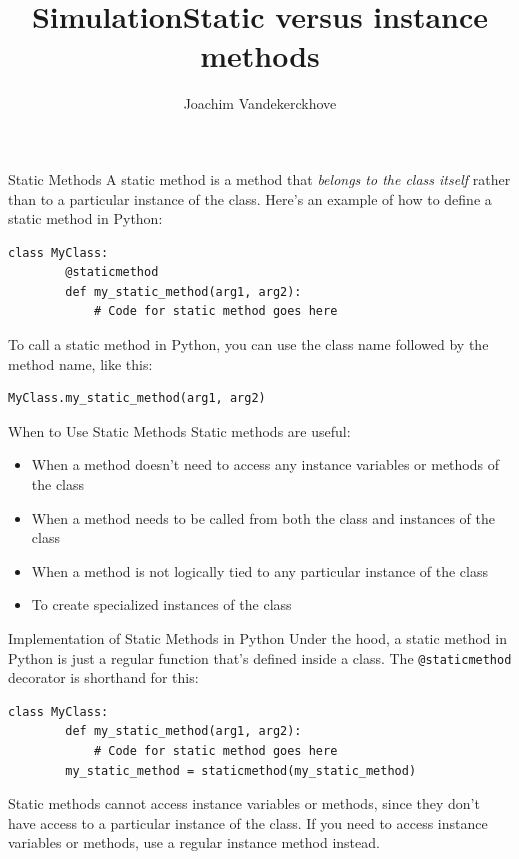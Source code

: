 \documentclass{beamer}
\title{Simulation}
\author{Joachim Vandekerckhove}
\date{}
\newcommand{\code}[1]{{\color{blue}\texttt{#1}}}
\begin{document}
\title{Static versus instance methods}
\begin{frame}
  \maketitle
\end{frame}

\begin{frame}[fragile]{Static Methods}
    A static method is a method that \emph{belongs to the class itself} rather than to a particular instance of the class. Here's an example of how to define a static method in Python:
    \begin{lstlisting}[style=python]
    class MyClass:
        @staticmethod
        def my_static_method(arg1, arg2):
            # Code for static method goes here
    \end{lstlisting}
    To call a static method in Python, you can use the class name followed by the method name, like this:
    \begin{lstlisting}[style=python]
    MyClass.my_static_method(arg1, arg2)
    \end{lstlisting}
\end{frame}

\begin{frame}[fragile]{When to Use Static Methods}
    Static methods are useful:
    \begin{itemize}
        \item When a method doesn't need to access any instance variables or methods of the class
        \item When a method needs to be called from both the class and instances of the class
        \item When a method is not logically tied to any particular instance of the class
        \item To create specialized instances of the class
    \end{itemize}
\end{frame}

\begin{frame}[fragile]{Implementation of Static Methods in Python}
    Under the hood, a static method in Python is just a regular function that's defined inside a class. The \code{@staticmethod} decorator is shorthand for this:
    \begin{lstlisting}[style=python]
    class MyClass:
        def my_static_method(arg1, arg2):
            # Code for static method goes here
        my_static_method = staticmethod(my_static_method)
    \end{lstlisting}
    Static methods cannot access instance variables or methods, since they don't have access to a particular instance of the class. If you need to access instance variables or methods, use a regular instance method instead.
\end{frame}
\end{document}
